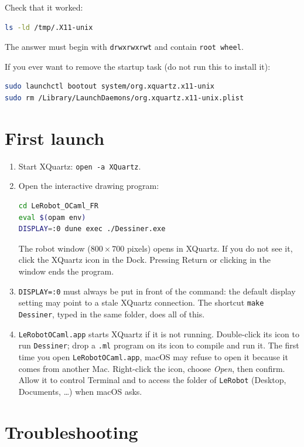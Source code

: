 \documentclass[11pt,a4paper]{article}
\newcommand{\kbd}[1]{\texttt{#1}}
\begin{document}
Check that it worked:
\begin{lstlisting}[language=bash]
ls -ld /tmp/.X11-unix
\end{lstlisting}
The answer must begin with \kbd{drwxrwxrwt} and contain \kbd{root wheel}.

If you ever want to remove the startup task (do not run this to install
it):
\begin{lstlisting}[language=bash]
sudo launchctl bootout system/org.xquartz.x11-unix
sudo rm /Library/LaunchDaemons/org.xquartz.x11-unix.plist
\end{lstlisting}

\section{First launch}

\begin{enumerate}
\item Start XQuartz: \kbd{open -a XQuartz}.
\item Open the interactive drawing program:
\begin{lstlisting}[language=bash]
cd LeRobot_OCaml_FR
eval $(opam env)
DISPLAY=:0 dune exec ./Dessiner.exe
\end{lstlisting}
  The robot window ($800 \times 700$ pixels) opens in XQuartz. If you do not
  see it, click the XQuartz icon in the Dock. Pressing Return or clicking in
  the window ends the program.
\item \kbd{DISPLAY=:0} must always be put in front of the command: the
  default display setting may point to a stale XQuartz connection. The
  shortcut \kbd{make Dessiner}, typed in the same folder, does all of this.
\item \kbd{LeRobotOCaml.app} starts XQuartz if it is not running.
  Double-click its icon to run \kbd{Dessiner}; drop a \kbd{.ml} program on
  its icon to compile and run it.
  The first time you open \kbd{LeRobotOCaml.app}, macOS may refuse to open it because it comes from
  another Mac. Right-click the icon, choose \emph{Open}, then confirm. Allow
  it to control Terminal and to access the folder of \kbd{LeRobot}
  (Desktop, Documents, \dots) when macOS asks.
\end{enumerate}

\section{Troubleshooting}
\end{document}
